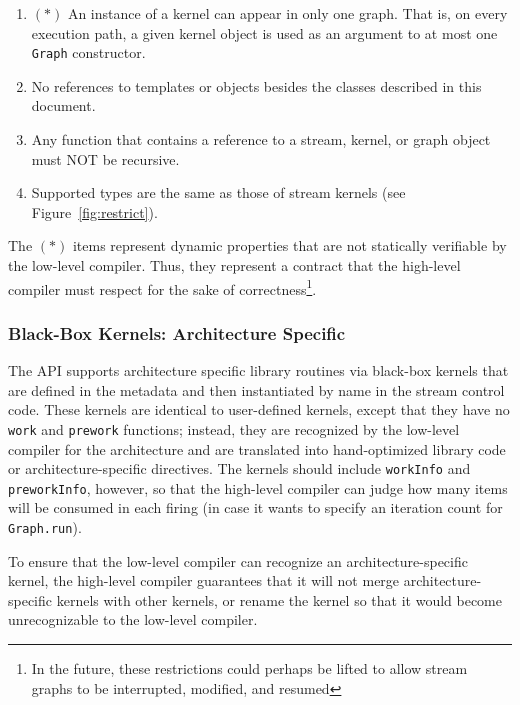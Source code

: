 \begin{enumerate}
\item $(*)$ An instance of a kernel can appear in only one graph.
That is, on every execution path, a given kernel object is used as an
argument to at most one {\tt Graph} constructor.

\item No references to templates or objects besides the classes described in this document.

\item Any function that contains a reference to a stream, kernel, or graph object must NOT be
recursive.

\item Supported types are the same as those of stream kernels (see Figure~\ref{fig:restrict}).

\end{enumerate}

The $(*)$ items represent dynamic properties that are not statically
verifiable by the low-level compiler.  Thus, they represent a contract
that the high-level compiler must respect for the sake of
correctness\footnote{In the future, these restrictions could perhaps
be lifted to allow stream graphs to be interrupted, modified, and
resumed}.

\subsubsection{Black-Box Kernels:  Architecture Specific}
\label{sec:library}

The API supports architecture specific library routines via black-box kernels that are defined
in the metadata and then instantiated by name in the stream control code.  These kernels are
identical to user-defined kernels, except that they have no {\tt work} and {\tt prework}
functions; instead, they are recognized by the low-level compiler for the architecture and are
translated into hand-optimized library code or architecture-specific directives.  The kernels
should include {\tt workInfo} and {\tt preworkInfo}, however, so that the high-level compiler
can judge how many items will be consumed in each firing (in case it wants to specify an
iteration count for {\tt Graph.run}).

To ensure that the low-level compiler can recognize an
architecture-specific kernel, the high-level compiler guarantees that
it will not merge architecture-specific kernels with other kernels, or
rename the kernel so that it would become unrecognizable to the
low-level compiler.


